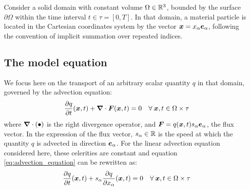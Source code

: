 Consider a solid domain with %
constant volume $\Omega \in \mathbb{R}^3$, bounded by the surface $\partial \Omega$ within the time interval $t \in \tau=[0,T]$.
In that domain, a material particle is located in the Cartesian coordinates system by the vector ${\mathbf{\boldsymbol{x}}}=x_\alpha {\mathbf{\boldsymbol{e}}}_\alpha$, following the convention of implicit summation over repeated indices.

\subsection{The model equation}
We focus here on the transport of an arbitrary scalar quantity $q$ in that domain, governed by the advection equation:
\begin{equation}
  \label{eq:advection_equation}
  \frac{\partial q}{\partial t}({\mathbf{\boldsymbol{x}}},t) +  {\mathbf{\boldsymbol{\nabla}}} \cdot {\mathbf{\boldsymbol{F}}}({\mathbf{\boldsymbol{x}}},t) = 0 \quad \forall \:{\mathbf{\boldsymbol{x}}},t \in \Omega \times \tau
\end{equation}
where ${\mathbf{\boldsymbol{\nabla}}} \cdot (\bullet)$ is the right divergence operator, and ${\mathbf{\boldsymbol{F}}}=q({\mathbf{\boldsymbol{x}}},t)s_\alpha {\mathbf{\boldsymbol{e}}}_\alpha$, the flux vector.
In the expression of the flux vector, $s_\alpha \in \mathbb{R}$ is the speed at which the quantity $q$ is advected in direction ${\mathbf{\boldsymbol{e}}}_\alpha$.
For the linear advection equation considered here, these celerities are constant and equation \eqref{eq:advection_equation} can be rewritten as:
\begin{equation}
  \label{eq:advection_equation_sum}
  \frac{\partial q}{\partial t}({\mathbf{\boldsymbol{x}}},t) +  s_\alpha \frac{\partial q}{\partial x_\alpha}({\mathbf{\boldsymbol{x}}},t) = 0\quad \forall \:{\mathbf{\boldsymbol{x}}},t \in \Omega \times \tau
\end{equation}

